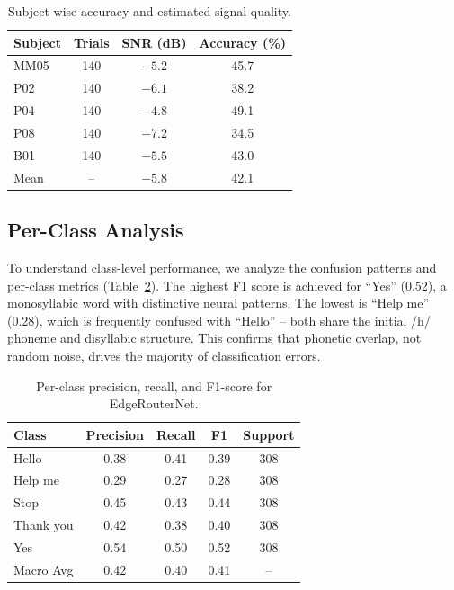 \documentclass[conference]{IEEEtran}
\newcommand{\method}{EdgeRouterNet}
\begin{document}
\begin{table}[t]
	\centering
	\caption{Subject-wise accuracy and estimated signal quality.}
	\label{tab:subjects}
	\renewcommand{\arraystretch}{1.1}
	\begin{tabular}{@{}lccc@{}}
		\toprule
		Subject & Trials & SNR (dB) & Accuracy (\%) \\
		\midrule
		MM05    & 140    & $-5.2$   & 45.7          \\
		P02     & 140    & $-6.1$   & 38.2          \\
		P04     & 140    & $-4.8$   & 49.1          \\
		P08     & 140    & $-7.2$   & 34.5          \\
		B01     & 140    & $-5.5$   & 43.0          \\
		\midrule
		Mean    & --     & $-5.8$   & 42.1          \\
		\bottomrule
	\end{tabular}
\end{table}

\subsection{Per-Class Analysis}
To understand class-level performance, we analyze the confusion patterns and per-class metrics (Table~\ref{tab:perclass}). The highest F1 score is achieved for ``Yes'' (0.52), a monosyllabic word with distinctive neural patterns. The lowest is ``Help me'' (0.28), which is frequently confused with ``Hello'' -- both share the initial /h/ phoneme and disyllabic structure. This confirms that phonetic overlap, not random noise, drives the majority of classification errors.

\begin{table}[t]
	\centering
	\caption{Per-class precision, recall, and F1-score for \method.}
	\label{tab:perclass}
	\renewcommand{\arraystretch}{1.1}
	\begin{tabular}{@{}lcccc@{}}
		\toprule
		Class     & Precision & Recall & F1   & Support \\
		\midrule
		Hello     & 0.38      & 0.41   & 0.39 & 308     \\
		Help me   & 0.29      & 0.27   & 0.28 & 308     \\
		Stop      & 0.45      & 0.43   & 0.44 & 308     \\
		Thank you & 0.42      & 0.38   & 0.40 & 308     \\
		Yes       & 0.54      & 0.50   & 0.52 & 308     \\
		\midrule
		Macro Avg & 0.42      & 0.40   & 0.41 & --      \\
		\bottomrule
	\end{tabular}
\end{table}
\end{document}
